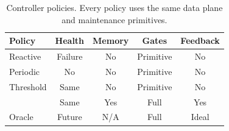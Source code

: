 \begin{table}[t]
  \centering
  \small
  \caption{Controller policies. Every policy uses the same \argosfs{} data plane and maintenance primitives.}
  \label{tab:baselines}
  \begin{tabular}{@{}lcccc@{}}
    \toprule
    Policy & Health & Memory & Gates & Feedback \\
    \midrule
    Reactive & Failure & No & Primitive & No \\
    Periodic & No & No & Primitive & No \\
    Threshold & Same & No & Primitive & No \\
    \autopilot{} & Same & Yes & Full & Yes \\
    Oracle & Future & N/A & Full & Ideal \\
    \bottomrule
  \end{tabular}
\end{table}
